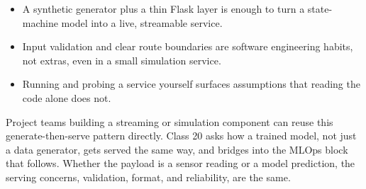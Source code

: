 \classclosingframe
{\begin{itemize}
\item A synthetic generator plus a thin Flask layer is enough to turn a state-machine model into a live, streamable service.
\item Input validation and clear route boundaries are software engineering habits, not extras, even in a small simulation service.
\item Running and probing a service yourself surfaces assumptions that reading the code alone does not.
\end{itemize}}
{Project teams building a streaming or simulation component can reuse this generate-then-serve pattern directly.}
{Class 20 asks how a trained model, not just a data generator, gets served the same way, and bridges into the MLOps block that follows.}
{Whether the payload is a sensor reading or a model prediction, the serving concerns, validation, format, and reliability, are the same.}


